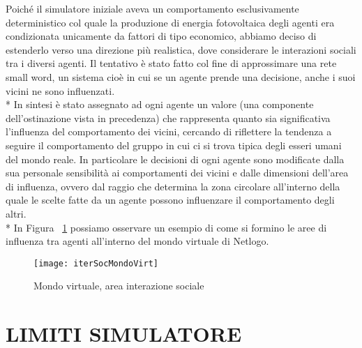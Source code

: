 \documentclass[12pt,a4paper,openright,twoside]{report}
\begin{document}
Poiché il simulatore iniziale aveva un comportamento esclusivamente deterministico col quale la produzione di energia fotovoltaica degli agenti era condizionata unicamente da fattori di tipo economico, abbiamo deciso di estenderlo verso una direzione più realistica, dove considerare le interazioni sociali tra i diversi agenti. Il tentativo è stato fatto col fine di approssimare una rete small word, un sistema cioè in cui se un agente prende una decisione, anche i suoi vicini ne sono influenzati.
\\*
In sintesi è stato assegnato ad ogni agente un valore (una componente dell'ostinazione vista in precedenza) che rappresenta quanto sia significativa l'influenza del comportamento dei vicini, cercando di riflettere la tendenza a seguire il comportamento del gruppo in cui ci si trova tipica degli esseri umani del mondo reale. In particolare le decisioni di ogni agente sono modificate dalla sua personale sensibilità ai comportamenti dei vicini e dalle dimensioni dell'area di influenza, ovvero dal raggio che determina la zona circolare all'interno della quale le scelte fatte da un agente possono influenzare il comportamento degli altri.\\*
In Figura ~\ref{iterSocMondoVirt} possiamo osservare un esempio di come si formino le aree di influenza tra agenti all'interno del mondo virtuale di Netlogo.

\begin{figure}[hbt]
	\centering
	\texttt{[image: iterSocMondoVirt]}
	\caption{Mondo virtuale, area interazione sociale}
	\label{iterSocMondoVirt}
\end{figure}

\section{LIMITI SIMULATORE}
\end{document}
